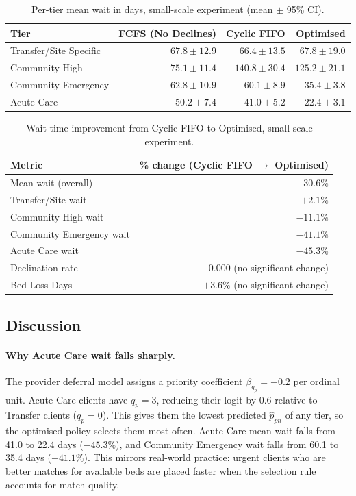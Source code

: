 \begin{table}[H]
\centering
\caption{Per-tier mean wait in days, small-scale experiment (mean $\pm$ 95\% CI).}
\label{tab:small_tier_wait}
\begin{tabular}{lrrr}
\toprule
\textbf{Tier} & \textbf{FCFS (No Declines)} & \textbf{Cyclic FIFO} & \textbf{Optimised} \\
\midrule
Transfer/Site Specific & $67.8 \pm 12.9$ & $66.4 \pm 13.5$ & $67.8 \pm 19.0$ \\
Community High         & $75.1 \pm 11.4$ & $140.8 \pm 30.4$ & $125.2 \pm 21.1$ \\
Community Emergency    & $62.8 \pm 10.9$ & $60.1 \pm 8.9$   & $35.4 \pm 3.8$ \\
Acute Care             & $50.2 \pm 7.4$  & $41.0 \pm 5.2$   & $22.4 \pm 3.1$ \\
\bottomrule
\end{tabular}
\end{table}

\begin{table}[H]
\centering
\caption{Wait-time improvement from Cyclic FIFO to Optimised, small-scale experiment.}
\label{tab:small_improvement}
\begin{tabular}{lr}
\toprule
\textbf{Metric} & \textbf{\% change (Cyclic FIFO $\to$ Optimised)} \\
\midrule
Mean wait (overall)             & $-30.6\%$ \\
\quad Transfer/Site wait        & $+2.1\%$ \\
\quad Community High wait       & $-11.1\%$ \\
\quad Community Emergency wait  & $-41.1\%$ \\
\quad Acute Care wait           & $-45.3\%$ \\
\midrule
Declination rate  & $0.000$ (no significant change) \\
Bed-Loss Days     & $+3.6\%$ (no significant change) \\
\bottomrule
\end{tabular}
\end{table}

\subsection{Discussion}

\paragraph{Why Acute Care wait falls sharply.}
The provider deferral model assigns a priority coefficient $\beta_{q_p} = -0.2$
per ordinal unit. Acute Care clients have $q_p = 3$, reducing their logit by
$0.6$ relative to Transfer clients ($q_p = 0$). This gives them the lowest
predicted $\hat{p}_{pn}$ of any tier, so the optimised policy selects them
most often. Acute Care mean wait falls from 41.0 to 22.4 days ($-45.3\%$), and
Community Emergency wait falls from 60.1 to 35.4 days ($-41.1\%$). This mirrors
real-world practice: urgent clients who are better matches for available beds
are placed faster when the selection rule accounts for match quality.

